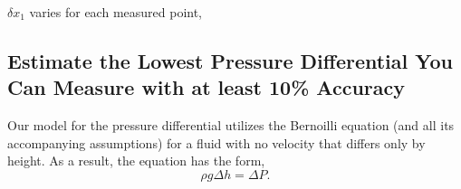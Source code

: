 \documentclass{article}
\begin{document}
$\delta x_1$ varies for each measured
point, 


\subsection{Estimate the Lowest Pressure Differential You Can Measure
  with at least 10\% Accuracy}

Our model for the pressure differential utilizes the Bernoilli equation
(and all its accompanying assumptions) for a fluid with no velocity that
differs only by height. As a result, the equation has the form,
\begin{equation}
 \rho g \Delta h = \Delta P. 
\end{equation}
\end{document}
